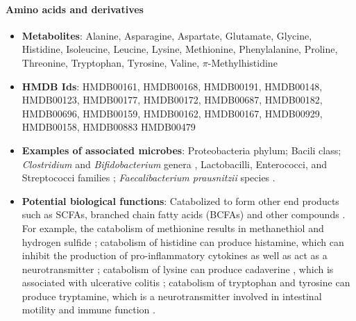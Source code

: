\paragraph{Amino acids and derivatives}  
\begin{itemize}
    \item \textbf{Metabolites}: Alanine, Asparagine, Aspartate, Glutamate, Glycine, Histidine, Isoleucine, Leucine, Lysine, Methionine, Phenylalanine, Proline, Threonine, Tryptophan, Tyrosine, Valine, $\pi$-Methylhistidine 
    \item \textbf{HMDB Ids}: HMDB00161, HMDB00168, HMDB00191, HMDB00148, HMDB00123, HMDB00177, HMDB00172, HMDB00687, HMDB00182, HMDB00696, HMDB00159, HMDB00162, HMDB00167, HMDB00929, HMDB00158, HMDB00883 HMDB00479 
    \item \textbf{Examples of associated microbes}: Proteobacteria phylum; Bacili class; \emph{Clostridium} and \emph{Bifidobacterium} genera \cite{portune2016gut}, Lactobacilli, Enterococci, and Streptococci families \cite{pugin2017wide}; \emph{Faecalibacterium prausnitzii} species \cite{li2008symbiotic}. 
    \item \textbf{Potential biological functions}: Catabolized to form other end products such as SCFAs, branched chain fatty acids (BCFAs) and other compounds \cite{oliphant2019macronutrient}. For example, the catabolism of methionine results in methanethiol and hydrogen sulfide \cite{portune2016gut}; catabolism of histidine can produce histamine, which can inhibit the production of pro-inflammatory cytokines as well as act as a neurotransmitter \cite{thomas2012histamine}; catabolism of lysine can produce cadaverine \cite{pugin2017wide}, which is associated with ulcerative colitis \cite{legall2011metabolomics}; catabolism of tryptophan and tyrosine can produce tryptamine, which is a neurotransmitter involved in intestinal motility and immune function \cite{gao2018impact}.
\end{itemize}

